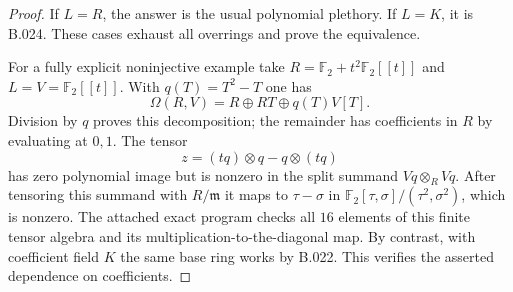 \begin{proof}
If $L=R$, the answer is the usual polynomial plethory.
If $L=K$, it is B.024. These cases exhaust all overrings and
prove the equivalence.

For a fully explicit noninjective example take
$R=\mathbb F_2+t^2\mathbb F_2[[t]]$ and $L=V=\mathbb F_2[[t]]$.
With $q(T)=T^2-T$ one has
\[
 \Omega(R,V)=R\oplus RT\oplus q(T)V[T].
\]
Division by $q$ proves this decomposition; the remainder has
coefficients in $R$ by evaluating at $0,1$. The tensor
\[
 z=(tq)\otimes q-q\otimes(tq)
\]
has zero polynomial image but is nonzero in the split summand
$Vq\otimes_RVq$. After tensoring this summand with $R/\mathfrak m$
it maps to $\tau-\sigma$ in
$\mathbb F_2[\tau,\sigma]/(\tau^2,\sigma^2)$, which is nonzero.
The attached exact program checks all $16$ elements of this finite
tensor algebra and its multiplication-to-the-diagonal map.
By contrast, with coefficient field $K$ the same base ring works
by B.022. This verifies the asserted dependence on coefficients.
\end{proof}


